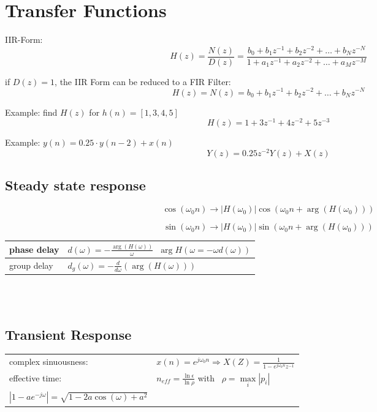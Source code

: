 \section{Transfer Functions}

IIR-Form:
\[ 
	H(z) = \frac{N(z)}{D(z)}
		= \frac{b_0 + b_1 z^{-1} + b_2 z^{-2} + \ldots + b_N z^{-N}}{1 + a_1 z^{-1} + a_2 z^{-2} + \ldots + a_M z^{-M} }
\]

if $D(z) = 1$, the IIR Form can be reduced to a FIR Filter:
\[
	H(z) = N(z) = b_0 + b_1 z^{-1} + b_2 z^{-2} + \ldots + b_N z^{-N}
\]

Example: find $H(z)$ for $h(n) = \left[1,3,4,5\right]$
\[ H(z) = 1 + 3z^{-1} + 4z^{-2} + 5z^{-3}\]

Example: $y(n) = 0.25 \cdot y(n-2) + x(n) $
\[
	Y(z) = 0.25z^{-2}Y(z) + X(z)
\]

\subsection{Steady state response}
\[\cos(\omega_0 n) \rightarrow \left|H(\omega_0) \right| \cos(\omega_0 n + \arg(H(\omega_0))) \]

\[\sin(\omega_0 n) \rightarrow \left|H(\omega_0) \right| \sin(\omega_0 n + \arg(H(\omega_0))) \]

\begin{tabularx}{0.6\textwidth}{|l|X|}
	\hline
	phase delay & $d(\omega) = - \frac{\arg(H(\omega))}{\omega}$\ \qquad $\arg H(\omega = -\omega d(\omega))$
	\\ \hline 
	group delay & $d_g(\omega) = -\frac{d}{d\omega}(\arg(H(\omega)))$	
	\\ \hline
\end{tabularx}\\ \\

\subsection{Transient Response}
\begin{tabularx}{1\textwidth}{l X}
	complex sinuousness: & $x(n) = e^{j \omega_0 n} \Rightarrow X(Z) = \frac{1}{1-e^{j \omega_0 n} z^{-1}} $
	\\ 
	effective time: & $n_{eff} = \frac{\ln \epsilon}{\ln \rho}$ \qquad with \qquad \
	$\rho = \max\limits_{i}\left|p_i \right|$
	\\ 
	$\left| 1-a e^{-j\omega}\right| = \sqrt{1-2a\cos(\omega) + a^2}$
\end{tabularx}\\ \\

